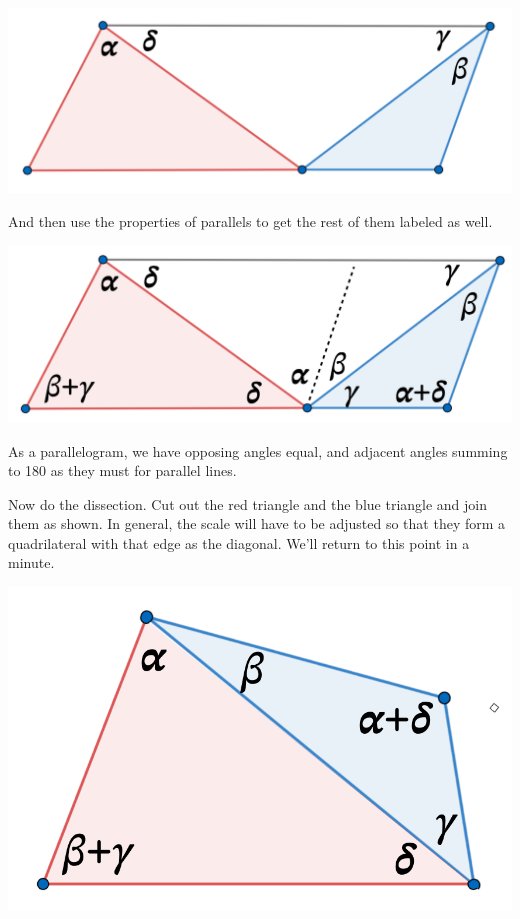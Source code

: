 \documentclass[11pt, oneside]{article}
\begin{document}
\begin{center} \includegraphics [scale=0.2] {Ptol2.png} \end{center}

And then use the properties of parallels to get the rest of them labeled as well.
\begin{center} \includegraphics [scale=0.2] {Ptol3.png} \end{center}

As a parallelogram, we have opposing angles equal, and adjacent angles summing to 180 as they must for parallel lines.

Now do the dissection.  Cut out the red triangle and the blue triangle and join them as shown.  In general, the scale will have to be adjusted so that they form a quadrilateral with that edge as the diagonal.  We'll return to this point in a minute.
\begin{center} \includegraphics [scale=0.2] {Ptol4.png} \end{center}
\end{document}
